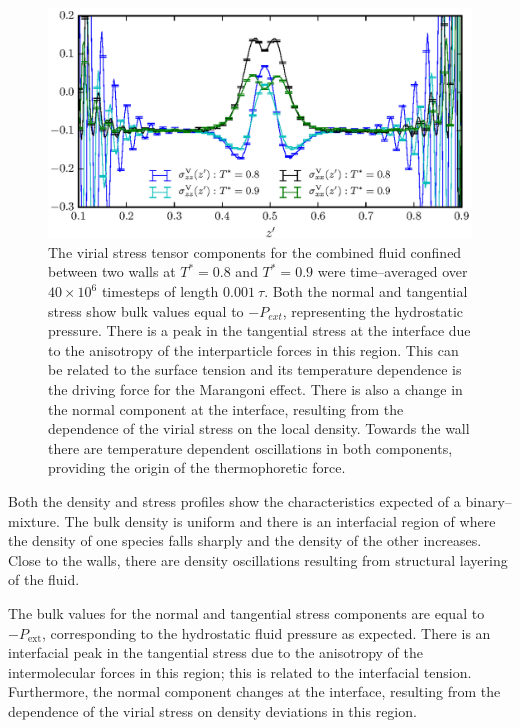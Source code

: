 \begin{figure}[h!]
\centering
\includegraphics[scale=1.0]{PisVirStress}
\caption{The virial stress tensor components for the combined fluid confined between two walls at $T^{*} = 0.8$ and $T^{*} = 0.9$ were time--averaged over $40 \times 10^{6}$ timesteps of length $0.001\ \tau$.
Both the normal and tangential stress show bulk values equal to $-P_{ext}$, representing the hydrostatic pressure.
There is a peak in the tangential stress at the interface due to the anisotropy of the interparticle forces in this region.
This can be related to the surface tension and its temperature dependence is the driving force for the Marangoni effect.
There is also a change in the normal component at the interface, resulting from the dependence of the virial stress on the local density.
Towards the wall there are temperature dependent oscillations in both components, providing the origin of the thermophoretic force.
}
\label{PisVirStress}
\end{figure}

Both the density and stress profiles show the characteristics expected of a binary--mixture. 
The bulk density is uniform and there is an interfacial region of where the density of one species falls sharply and the density of the other increases.
Close to the walls, there are density oscillations resulting from structural layering of the fluid.

The bulk values for the normal and tangential stress components are equal to $-P_{\mathrm{ext}}$, corresponding to the hydrostatic fluid pressure as expected.
There is an interfacial peak in the tangential stress due to the anisotropy of the intermolecular forces in this region; this is related to the interfacial tension.\cite{Marchand2011}
Furthermore, the normal component changes at the interface, resulting from the dependence of the virial stress on density deviations in this region.

